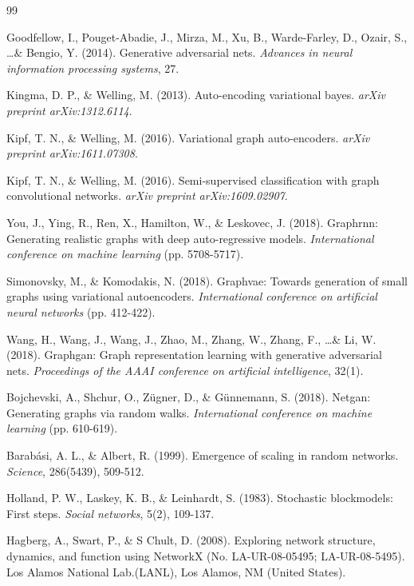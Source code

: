 \documentclass[12pt]{article}
\begin{document}

\begin{thebibliography}{99}

Goodfellow, I., Pouget-Abadie, J., Mirza, M., Xu, B., Warde-Farley, D., Ozair, S., \ldots \& Bengio, Y. (2014). Generative adversarial nets. \textit{Advances in neural information processing systems}, 27.

Kingma, D. P., \& Welling, M. (2013). Auto-encoding variational bayes. \textit{arXiv preprint arXiv:1312.6114}.

Kipf, T. N., \& Welling, M. (2016). Variational graph auto-encoders. \textit{arXiv preprint arXiv:1611.07308}.

Kipf, T. N., \& Welling, M. (2016). Semi-supervised classification with graph convolutional networks. \textit{arXiv preprint arXiv:1609.02907}.

You, J., Ying, R., Ren, X., Hamilton, W., \& Leskovec, J. (2018). Graphrnn: Generating realistic graphs with deep auto-regressive models. \textit{International conference on machine learning} (pp. 5708-5717).

Simonovsky, M., \& Komodakis, N. (2018). Graphvae: Towards generation of small graphs using variational autoencoders. \textit{International conference on artificial neural networks} (pp. 412-422).

Wang, H., Wang, J., Wang, J., Zhao, M., Zhang, W., Zhang, F., \ldots \& Li, W. (2018). Graphgan: Graph representation learning with generative adversarial nets. \textit{Proceedings of the AAAI conference on artificial intelligence}, 32(1).

Bojchevski, A., Shchur, O., Zügner, D., \& Günnemann, S. (2018). Netgan: Generating graphs via random walks. \textit{International conference on machine learning} (pp. 610-619).

Barabási, A. L., \& Albert, R. (1999). Emergence of scaling in random networks. \textit{Science}, 286(5439), 509-512.

Holland, P. W., Laskey, K. B., \& Leinhardt, S. (1983). Stochastic blockmodels: First steps. \textit{Social networks}, 5(2), 109-137.

Hagberg, A., Swart, P., \& S Chult, D. (2008). Exploring network structure, dynamics, and function using NetworkX (No. LA-UR-08-05495; LA-UR-08-5495). Los Alamos National Lab.(LANL), Los Alamos, NM (United States).


\end{thebibliography}
\end{document}
